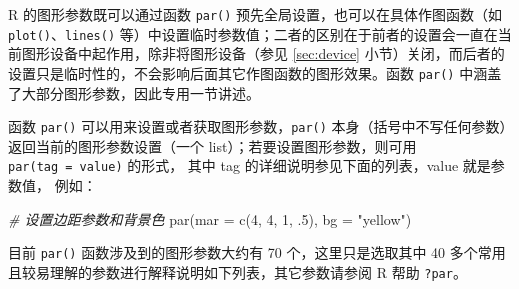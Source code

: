 \documentclass[
  b5paper,
  UTF8,twoside]{book}
\newenvironment{Shaded}{\begin{snugshade}}{\end{snugshade}}
\newcommand{\AttributeTok}[1]{\textcolor[rgb]{0.77,0.63,0.00}{#1}}
\newcommand{\CommentTok}[1]{\textcolor[rgb]{0.56,0.35,0.01}{\textit{#1}}}
\newcommand{\DecValTok}[1]{\textcolor[rgb]{0.00,0.00,0.81}{#1}}
\newcommand{\FunctionTok}[1]{\textcolor[rgb]{0.00,0.00,0.00}{#1}}
\newcommand{\NormalTok}[1]{#1}
\newcommand{\StringTok}[1]{\textcolor[rgb]{0.31,0.60,0.02}{#1}}
\begin{document}
R 的图形参数既可以通过函数 \texttt{par()} 预先全局设置，也可以在具体作图函数（如 \texttt{plot()}、\texttt{lines()} 等）中设置临时参数值；二者的区别在于前者的设置会一直在当前图形设备中起作用，除非将图形设备（参见 \ref{sec:device} 小节）关闭，而后者的设置只是临时性的，不会影响后面其它作图函数的图形效果。函数 \texttt{par()} 中涵盖了大部分图形参数，因此专用一节讲述。

函数 \texttt{par()} 可以用来设置或者获取图形参数，\texttt{par()} 本身（括号中不写任何参数）返回当前的图形参数设置（一个 list）；若要设置图形参数，则可用 \texttt{par(tag\ =\ value)} 的形式， 其中 tag 的详细说明参见下面的列表，value 就是参数值， 例如：

\begin{Shaded}
\begin{Highlighting}[]
\CommentTok{\# 设置边距参数和背景色}
\FunctionTok{par}\NormalTok{(}\AttributeTok{mar =} \FunctionTok{c}\NormalTok{(}\DecValTok{4}\NormalTok{, }\DecValTok{4}\NormalTok{, }\DecValTok{1}\NormalTok{, .}\DecValTok{5}\NormalTok{), }\AttributeTok{bg =} \StringTok{"yellow"}\NormalTok{)}
\end{Highlighting}
\end{Shaded}

目前 \texttt{par()} 函数涉及到的图形参数大约有 70 个，这里只是选取其中 40 多个常用且较易理解的参数进行解释说明如下列表，其它参数请参阅 R 帮助 \texttt{?par}。
\end{document}
